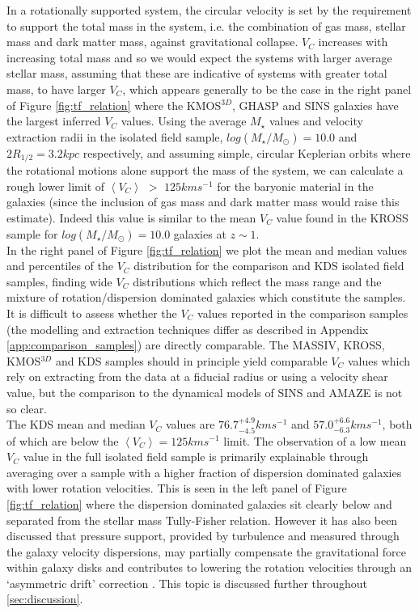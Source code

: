\documentclass[fleqn,usenatbib]{mn2e}
\begin{document}
In a rotationally supported system, the circular velocity is set by the requirement to support the total mass in the system, i.e. the combination of gas mass, stellar mass and dark matter mass, against gravitational collapse.
$V_{C}$ increases with increasing total mass and so we would expect the systems with larger average stellar mass, assuming that these are indicative of systems with greater total mass, to have larger $V_{C}$, which appears generally to be the case in the right panel of Figure \ref{fig:tf_relation} where the KMOS$^{3D}$, GHASP and SINS galaxies have the largest inferred $V_{C}$ values.
Using the average $M_{\star}$ values and velocity extraction radii in the isolated field sample, $log(M_{\star}/M_{\odot})=10.0$ and $2R_{1/2} = 3.2kpc$ respectively, and assuming simple, circular Keplerian orbits where the rotational motions alone support the mass of the system, we can calculate a rough lower limit of $\left<V_{C}\right>$ $>$ $125kms^{-1}$ for the baryonic material in the galaxies (since the inclusion of gas mass and dark matter mass would raise this estimate).
Indeed this value is similar to the mean $V_{C}$ value found in the KROSS sample for $log(M_{\star}/M_{\odot})=10.0$ galaxies at $z\sim1$. \\

In the right panel of Figure \ref{fig:tf_relation} we plot the mean and median values and percentiles of the $V_{C}$ distribution for the comparison and KDS isolated field samples, finding wide $V_{C}$ distributions which reflect the mass range and the mixture of rotation/dispersion dominated galaxies which constitute the samples.
It is difficult to assess whether the $V_{C}$ values reported in the comparison samples (the modelling and extraction techniques differ as described in Appendix \ref{app:comparison_samples}) are directly comparable.
The MASSIV, KROSS, KMOS$^{3D}$ and KDS samples should in principle yield comparable $V_{C}$ values which rely on extracting from the data at a fiducial radius or using a velocity shear value, but the comparison to the dynamical models of SINS and AMAZE is not so clear. \\

The KDS mean and median $V_{C}$ values are $76.7^{+4.9}_{-4.5}kms^{-1}$ and $57.0^{+6.6}_{-6.3}kms^{-1}$, both of which are below the $\left<V_{C}\right> = 125kms^{-1}$ limit.
The observation of a low mean $V_{C}$ value in the full isolated field sample is primarily explainable through averaging over a sample with a higher fraction of dispersion dominated galaxies with lower rotation velocities.
This is seen in the left panel of Figure \ref{fig:tf_relation} where the dispersion dominated galaxies sit clearly below and separated from the stellar mass Tully-Fisher relation.
However it has also been discussed that pressure support, provided by turbulence and measured through the galaxy velocity dispersions, may partially compensate the gravitational force within galaxy disks and contributes to lowering the rotation velocities through an `asymmetric drift' correction \citep[e.g.][]{Burkert2010,Newman2013,Genzel2017}.
This topic is discussed further throughout \cref{sec:discussion}. 
\end{document}
